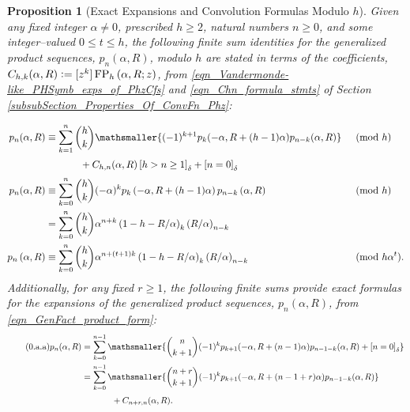 \documentclass[12pt,reqno]{article}
\renewenvironment{subequations}{%
  \refstepcounter{equation}%
  \edef\theparentequation{\theequation}%
  \setcounter{parentequation}{\value{equation}}%
  \setcounter{equation}{0}%
  \def\theequation{\theparentequation.\alph{equation}}%
  \ignorespaces
}{%
  \setcounter{equation}{\value{parentequation}}%
  \ignorespacesafterend
}
\numberwithin{sfootnote}{section}
\numberwithin{equation}{section}
\newcommand{\tagonce}[0]{
     \addtocounter{equation}{1}
     \tag{\theequation}
}
\theoremstyle{plain}
\newtheorem{prop}[theorem]{Proposition}
\theoremstyle{definition}
\theoremstyle{remark}
\newcommand{\defequals}{\ensuremath{\vcentcolon=}}
\newcommand{\Pochhammer}[2]{\ensuremath{\left(#1\right)_{#2}}}
\newcommand{\Iverson}[1]{\ensuremath{\left[#1\right]_{\delta}}}
\newcommand{\pn}[3]{\ensuremath{p_{#1}\left(#2, #3\right)}}
\newcommand{\ConvFP}[4]{\ensuremath{\FP_{#1}\left(#2, #3; #4\right)}}
\DeclareMathOperator{\FP}{FP}
\begin{document}
\begin{prop}[Exact Expansions and Convolution Formulas Modulo $h$] 
\label{prop_ExactFormulas_CongruencesModh_from_FiniteDiffEqns} 
Given any fixed integer $\alpha \neq 0$, prescribed $h \geq 2$, 
natural numbers $n \geq 0$, and some 
integer--valued $0 \leq t \leq h$, the 
following finite sum identities for the 
generalized product sequences, $\pn{n}{\alpha}{R}$, modulo $h$ 
are stated in terms of the coefficients, 
$C_{h,k}(\alpha, R) \defequals [z^{k}] \ConvFP{h}{\alpha}{R}{z}$, 
from \eqref{eqn_Vandermonde-like_PHSymb_exps_of_PhzCfs} and 
\eqref{eqn_Chn_formula_stmts} of 
Section \ref{subsubSection_Properties_Of_ConvFn_Phz}: 
\begin{subequations} 
\label{eqn_pnAlphaR_seqs_finite_sum_reps_modulop} 
\begin{align} 
\label{eqn_pnAlphaR_seqs_finite_sum_reps_modulop-stmts_v0} 
p_{n}(\alpha, R) & \equiv 
     \sum\limits_{k=1}^{n} 
     \binom{h}{k} 
     \mathsmaller{ 
     (-1)^{k+1} 
     p_{k}(-\alpha, R + (h-1) \alpha) p_{n-k}(\alpha, R) 
     } && \pmod{h} \\ 
\notag 
     & \phantom{\equiv\sum\quad} + 
     C_{h,n}(\alpha, R) \Iverson{h > n \geq 1} + \Iverson{n = 0} 
     && \\ 
\label{eqn_pnAlphaR_seqs_finite_sum_reps_modulop-stmts_v1} 
p_{n}(\alpha, R) & \equiv 
     \sum\limits_{k=0}^{n} \binom{h}{k} (-\alpha)^{k} 
     \pn{k}{-\alpha}{R + (h-1) \alpha} \pn{n-k}{\alpha}{R} 
     && \pmod{h} \\ 
\notag 
     & = 
     \sum\limits_{k=0}^{n} \binom{h}{k} \alpha^{n+k} 
     \Pochhammer{1-h-R / \alpha}{k} \Pochhammer{R / \alpha}{n-k} 
     && \\ 
\label{eqn_pnAlphaR_seqs_finite_sum_reps_modulop-stmts_v2} 
\pn{n}{\alpha}{R} & \equiv 
     \sum\limits_{k=0}^{n} \binom{h}{k} \alpha^{n+(t+1)k} 
     \Pochhammer{1-h-R / \alpha}{k} \Pochhammer{R / \alpha}{n-k} 
     && \pmod{h \alpha^{t}}. 
\end{align} 
\end{subequations} 
Additionally, for any fixed $r \geq 1$, the following finite sums 
provide exact formulas for the expansions of the 
generalized product sequences, 
$\pn{n}{\alpha}{R}$, from \eqref{eqn_GenFact_product_form}: 
\begin{align*} 
\tagonce\label{eqn_pnAlphaR_seqs_exact_finite_sum_reps-stmts_v2} 
p_{n}(\alpha, R) 
     & = 
     \sum_{k=0}^{n-1} 
     \mathsmaller{ 
     \binom{n}{k+1} (-1)^{k} 
     p_{k+1}(-\alpha, R + (n-1) \alpha) p_{n-1-k}(\alpha, R) + 
     \Iverson{n = 0} 
     } \\ 
     & = 
     \sum_{k=0}^{n-1} 
     \mathsmaller{ 
     \binom{n+r}{k+1} (-1)^{k} 
     p_{k+1}(-\alpha, R + (n-1+r) \alpha) 
     p_{n-1-k}(\alpha, R) 
     } \\ 
     & \phantom{= \sum \quad} + 
     C_{n+r,n}(\alpha, R). 
\end{align*} 
\end{prop} 
\end{document}
